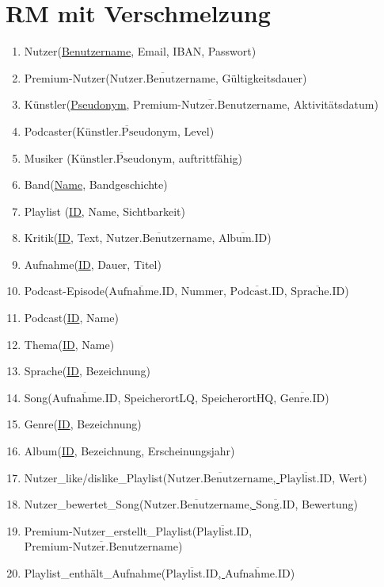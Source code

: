 \documentclass[a4paper,11pt]{article}
\begin{document}
\section*{RM mit Verschmelzung}
\begin{enumerate}
    \item Nutzer(\underline{Benutzername}, Email, IBAN, Passwort)
    \item Premium-Nutzer(\underline{$\overline{\text{Nutzer.Benutzername}}$}, Gültigkeitsdauer)
    \item Künstler(\underline{Pseudonym}, $\overline{\text{Premium-Nutzer.Benutzername}}$, Aktivitätsdatum)
    \item Podcaster(\underline{$\overline{\text{Künstler.Pseudonym}}$}, Level)
    \item Musiker (\underline{$\overline{\text{Künstler.Pseudonym}}$}, auftrittfähig)
    \item Band(\underline{Name}, Bandgeschichte)
    \item Playlist (\underline{ID}, Name, Sichtbarkeit)
    \item Kritik(\underline{ID}, Text, $\overline{\text{Nutzer.Benutzername}}$, $\overline{\text{Album.ID}}$)
    \item Aufnahme(\underline{ID}, Dauer, Titel)
    \item Podcast-Episode(\underline{$\overline{\text{Aufnahme.ID}}$}, Nummer,  $\overline{\text{Podcast.ID}}$, $\overline{\text{Sprache.ID}}$)
    \item Podcast(\underline{ID}, Name)
    \item Thema(\underline{ID}, Name)
    \item Sprache(\underline{ID}, Bezeichnung)
    \item Song(\underline{$\overline{\text{Aufnahme.ID}}$}, SpeicherortLQ, SpeicherortHQ, $\overline{\text{Genre.ID}}$)
    \item Genre(\underline{ID}, Bezeichnung)
    \item Album(\underline{ID}, Bezeichnung, Erscheinungsjahr)
    \item Nutzer\_like/dislike\_Playlist(\underline{$\overline{\text{Nutzer.Benutzername}}$, $\overline{\text{Playlist.ID}}$}, Wert)
    
    
    \item Nutzer\_bewertet\_Song(\underline{$\overline{\text{Nutzer.Benutzername}}$, $\overline{\text{Song.ID}}$}, Bewertung)
    \item Premium-Nutzer\_erstellt\_Playlist(\underline{$\overline{\text{Playlist.ID}}$}, $\overline{\text{Premium-Nutzer.Benutzername}}$)
    \item Playlist\_enthält\_Aufnahme(\underline{$\overline{\text{Playlist.ID}}$, $\overline{\text{Aufnahme.ID}}$})
  

\end{enumerate}
\end{document}
